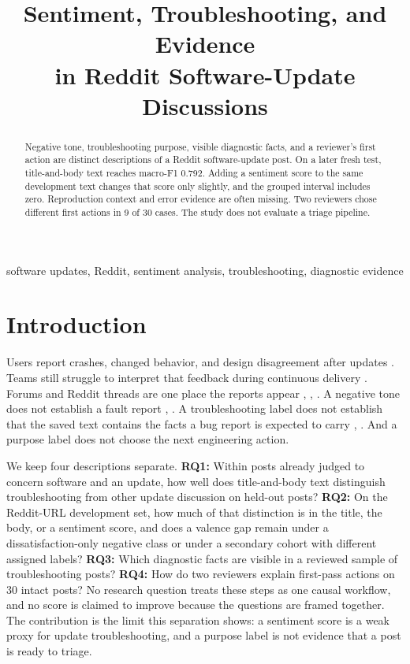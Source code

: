 \documentclass[conference,letterpaper]{IEEEtran}
\title{Sentiment, Troubleshooting, and Evidence\\
in Reddit Software-Update Discussions}
\author{\IEEEauthorblockN{Manu Mathew Jiss and Solomon Berhe}
\IEEEauthorblockA{School of Engineering and Computer Science\\
University of the Pacific, Stockton, California, USA\\
m\_jiss@u.pacific.edu, sberhe@pacific.edu}}
\begin{document}
\maketitle
\begin{abstract}
Negative tone, troubleshooting purpose, visible diagnostic facts, and a reviewer's first action are distinct descriptions of a Reddit software-update post. On a later fresh test, title-and-body text reaches macro-F1 0.792. Adding a sentiment score to the same development text changes that score only slightly, and the grouped interval includes zero. Reproduction context and error evidence are often missing. Two reviewers chose different first actions in 9 of 30 cases. The study does not evaluate a triage pipeline.
\end{abstract}
\begin{IEEEkeywords}
software updates, Reddit, sentiment analysis, troubleshooting, diagnostic evidence
\end{IEEEkeywords}

\section{Introduction}
Users report crashes, changed behavior, and design disagreement after updates \cite{Hassan2020BadUpdates}. Teams still struggle to interpret that feedback during continuous delivery \cite{Tkalich2025Feedback}. Forums and Reddit threads are one place the reports appear \cite{Iqbal2021Reddit}, \cite{Tizard2019Forums}, \cite{Singh2024ReleaseNotes}. A negative tone does not establish a fault report \cite{Jongeling2017Negative}, \cite{Lin2018HowFar}. A troubleshooting label does not establish that the saved text contains the facts a bug report is expected to carry \cite{Bettenburg2008GoodReport}, \cite{Chaparro2017Missing}. And a purpose label does not choose the next engineering action.

We keep four descriptions separate. \textbf{RQ1:} Within posts already judged to concern software and an update, how well does title-and-body text distinguish troubleshooting from other update discussion on held-out posts? \textbf{RQ2:} On the Reddit-URL development set, how much of that distinction is in the title, the body, or a sentiment score, and does a valence gap remain under a dissatisfaction-only negative class or under a secondary cohort with different assigned labels? \textbf{RQ3:} Which diagnostic facts are visible in a reviewed sample of troubleshooting posts? \textbf{RQ4:} How do two reviewers explain first-pass actions on 30 intact posts? No research question treats these steps as one causal workflow, and no score is claimed to improve because the questions are framed together. The contribution is the limit this separation shows: a sentiment score is a weak proxy for update troubleshooting, and a purpose label is not evidence that a post is ready to triage.
\end{document}
